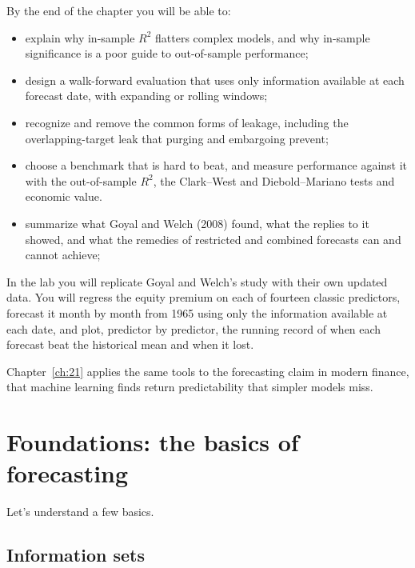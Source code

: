 By the end of the chapter you will be able to:

\begin{itemize}
  \item explain why in-sample $R^2$ flatters complex models, and why in-sample significance is a poor guide to out-of-sample performance;
  \item design a walk-forward evaluation that uses only information available at each forecast date, with expanding or rolling windows;
  \item recognize and remove the common forms of leakage, including the overlapping-target leak that purging and embargoing prevent;
  \item choose a benchmark that is hard to beat, and measure performance against it with the out-of-sample $R^2$, the Clark--West and Diebold--Mariano tests and economic value.
  \item summarize what Goyal and Welch (2008) found, what the replies to it showed, and what the remedies of restricted and combined forecasts can and cannot achieve;
\end{itemize}

In the lab you will replicate Goyal and Welch's study with their own updated data. You will regress the equity premium on each of fourteen classic predictors, forecast it month by month from 1965 using only the information available at each date, and plot, predictor by predictor, the running record of when each forecast beat the historical mean and when it lost. 

Chapter~\ref{ch:21} applies the same tools to the forecasting claim in modern finance, that machine learning finds return predictability that simpler models miss.

\section{Foundations: the basics of forecasting}
\label{sec:05-foundations}

Let's understand a few basics.

\subsection{Information sets}

